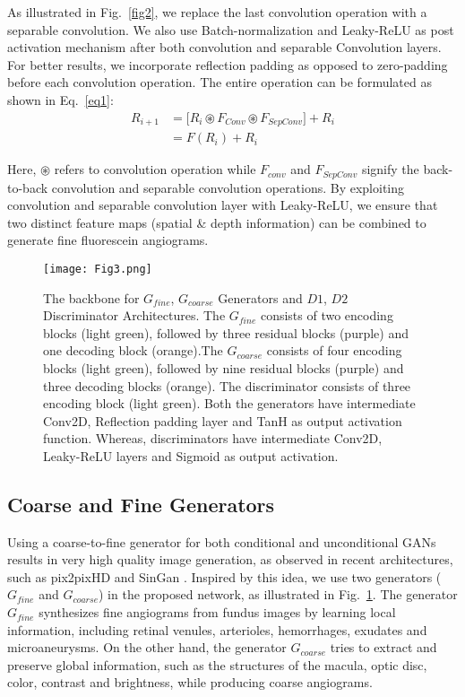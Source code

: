 \documentclass[runningheads]{llncs}
\begin{document}
As illustrated in Fig.~\ref{fig2}, we replace the last convolution operation with a separable convolution. We also use Batch-normalization and Leaky-ReLU as post activation mechanism after both convolution and separable Convolution layers. For better results, we incorporate reflection padding as opposed to zero-padding before each convolution operation. The entire operation can be formulated as shown in Eq.~\ref{eq1}:
\begin{equation}
\begin{split}
R_{i+1} &=  \big[R_{i}  \circledast F_{Conv} \circledast F_{SepConv} \big] + R_{i} 
\\ &=   F(R_{i}) + R_{i}
\label{eq1}
\end{split}
\end{equation}



Here, $\circledast$ refers to convolution operation while $F_{conv}$ and $F_{SepConv}$ signify the back-to-back convolution and separable convolution operations. By exploiting convolution and separable convolution layer with Leaky-ReLU, we ensure that two distinct feature maps (spatial \& depth information) can be combined to generate fine fluorescein angiograms. 

\begin{figure}[htb]
    \centering
    \texttt{[image: Fig3.png]}
    \caption{The backbone for $G_{fine}$, $G_{coarse}$ Generators and $D1$, $D2$  Discriminator Architectures. The $G_{fine}$ consists of two encoding blocks (light green), followed by three residual blocks (purple) and one decoding block (orange).The $G_{coarse}$ consists of four encoding blocks (light green), followed by nine residual blocks (purple) and three decoding blocks (orange). The discriminator consists of three encoding block (light green). Both the generators have intermediate Conv2D, Reflection padding layer and TanH as output activation function. Whereas, discriminators have intermediate Conv2D, Leaky-ReLU layers and Sigmoid as output activation.}
    \label{fig3}
\end{figure}


\subsection{Coarse and Fine Generators}\label{subsec:generators}

Using a coarse-to-fine generator for both conditional and unconditional GANs results in very high quality image generation, as observed in recent architectures, such as pix2pixHD \cite{wang2018high} and SinGan \cite{shaham2019singan}. Inspired by this idea, we use two generators ($G_{fine}$ and $G_{coarse}$) in the proposed network, as illustrated in Fig.~\ref{fig3}. The generator $G_{fine}$ synthesizes fine angiograms from fundus images by learning local information, including retinal venules, arterioles, hemorrhages, exudates and microaneurysms. On the other hand, the generator $G_{coarse}$ tries to extract and preserve global information, such as the structures of the macula, optic disc, color, contrast and brightness, while producing coarse angiograms. 
\end{document}
